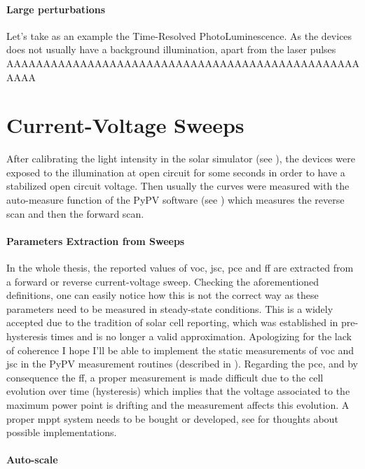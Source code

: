 	\paragraph{Large perturbations} Let's take as an example the Time-Resolved PhotoLuminescence. As the devices does not usually have a background illumination, apart from the laser pulses AAAAAAAAAAAAAAAAAAAAAAAAAAAAAAAAAAAAAAAAAAAAAAAAAAAA





\section{Current-Voltage Sweeps}

After calibrating the light intensity in the solar simulator (see ), the devices were exposed to the illumination at open circuit for some seconds in order to have a stabilized open circuit voltage. Then usually the curves were measured with the auto-measure function of the PyPV software (see ) which measures the reverse scan and then the forward scan.

\paragraph{Parameters Extraction from Sweeps}
In the whole thesis, the reported values of \gls{voc}, \gls{jsc}, \gls{pce} and \gls{ff} are extracted from a forward or reverse current-voltage sweep. Checking the aforementioned definitions, one can easily notice how this is not the correct way as these parameters need to be measured in steady-state conditions. This is a widely accepted due to the tradition of solar cell reporting, which was established in pre-hysteresis times and is no longer a valid approximation. Apologizing for the lack of coherence I hope I'll be able to implement the static measurements of \gls{voc} and \gls{jsc} in the PyPV measurement routines (described in ). Regarding the \gls{pce}, and by consequence the \gls{ff}, a proper measurement is made difficult due to the cell evolution over time (hysteresis) which implies that the voltage associated to the maximum power point is drifting and the measurement affects this evolution. A proper \gls{mppt} system needs to be bought or developed, see  for thoughts about possible implementations.

\paragraph{Auto-scale}\label{autoscale}

